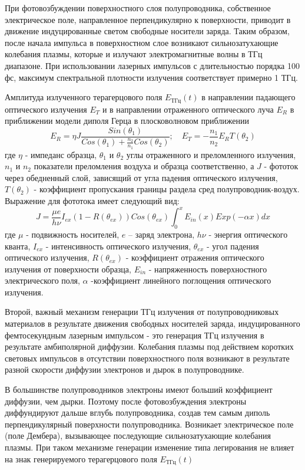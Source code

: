 \documentclass[a4paper,14pt,russian]{extreport}
\begin{document}
				При фотовозбуждении поверхностного слоя полупроводника, собственное электрическое поле, направленное перпендикулярно к поверхности, приводит в движение индуцированные светом свободные носители заряда. Таким образом, после начала импульса в поверхностном слое возникают сильнозатухающие колебания плазмы, которые и излучают электромагнитные волны в ТГц диапазоне. При использовании лазерных импульсов с длительностью порядка 100 фс, максимум спектральной плотности излучения соответствует примерно 1 ТГц.\par
				Амплитуда излученного терагерцового поля $E_{\text{ТГц}}(t)$ в направлении падающего оптического излучения $E_T$ и в направлении отраженного оптического луча $E_R$ в приближении модели диполя Герца в плосковолновом приближении
				\begin{equation}\label{THzAmplitude}
					E_R = \eta J \frac{Sin(\theta_1)}{Cos(\theta_1)+\frac{n_2}{n_1}Cos(\theta_2)}; \quad
					E_T = -\frac{n_1}{n_2}E_R T(\theta_2)
				\end{equation}
				где $\eta$ - импеданс образца, $\theta_1$ и $\theta_2$ углы отраженного и преломленного излучения, $n_1$ и $n_2$ показатели преломления воздуха и образца соответственно, а $J$ - фототок через обедненный слой, зависящий от угла падения оптического излучения, $T(\theta_2)$ - коэффициент пропускания границы раздела сред полупроводник-воздух. Выражение для фототока имеет следующий вид:
				\begin{equation}\label{CurrentDencity}
					J = \frac{\mu e}{h \nu} I_{ex}(1-R(\theta_{ex}))Cos(\theta_{ex})\int_0^{x}E_{in}(x)Exp(-\alpha x)dx
				\end{equation}
				где $\mu$ - подвижность носителей, $e$ – заряд электрона, $h \nu$ - энергия оптического
кванта, $I_{ex}$ - интенсивность оптического излучения, $\theta_{ex}$ - угол падения оптического излучения, $R(\theta_{ex})$ - коэффициент отражения оптического излучения от поверхности образца, $E_{in}$ - напряженность поверхностного электрического поля, $\alpha$ -коэффициент линейного поглощения оптического излучения.\par
				Второй, важный механизм генерации ТГц излучения от полупроводниковых материалов в результате движения свободных носителей заряда, индуцированного фемтосекундным лазерным импульсом - это генерация ТГц излучения в результате амбиполярной диффузии. Колебания плазмы под действием коротких световых импульсов в отсутствии
поверхностного поля возникают в результате разной скорости диффузии электронов и дырок в полупроводнике.\par
				В большинстве полупроводников электроны имеют больший коэффициент диффузии, чем дырки. Поэтому после	фотовозбуждения электроны диффундируют дальше вглубь полупроводника, создав тем самым диполь перпендикулярный поверхности полупроводника. Возникает электрическое поле (поле Дембера), вызывающее последующие сильнозатухающие колебания плазмы. При таком механизме генерации изменение типа легирования не влияет на знак генерируемого терагерцового поля $E_{\text{ТГц}}(t)$
\end{document}
